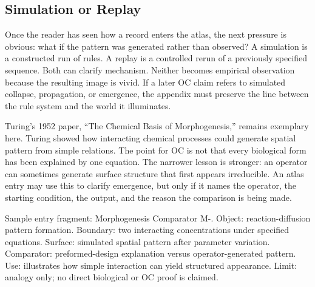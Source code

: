 \documentclass[11pt,a4paper,openany]{book}
\begin{document}
\subsection{Simulation or Replay}
Once the reader has seen how a record enters the atlas, the next pressure is obvious: what if the pattern was generated rather than observed? A simulation is a constructed run of rules. A replay is a controlled rerun of a previously specified sequence. Both can clarify mechanism. Neither becomes empirical observation because the resulting image is vivid. If a later OC claim refers to simulated collapse, propagation, or emergence, the appendix must preserve the line between the rule system and the world it illuminates. \cite{barabasi_scale_free,may_stability_complexity}\par
Turing's 1952 paper, ``The Chemical Basis of Morphogenesis,'' remains exemplary here. Turing showed how interacting chemical processes could generate spatial pattern from simple relations. The point for OC is not that every biological form has been explained by one equation. The narrower lesson is stronger: an operator can sometimes generate surface structure that first appears irreducible. An atlas entry may use this to clarify emergence, but only if it names the operator, the starting condition, the output, and the reason the comparison is being made.\par
Sample entry fragment: Morphogenesis Comparator M-. Object: reaction-diffusion pattern formation. Boundary: two interacting concentrations under specified equations. Surface: simulated spatial pattern after parameter variation. Comparator: preformed-design explanation versus operator-generated pattern. Use: illustrates how simple interaction can yield structured appearance. Limit: analogy only; no direct biological or OC proof is claimed.\par
\end{document}
